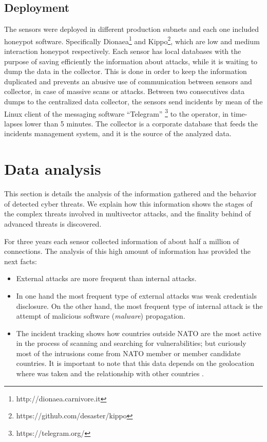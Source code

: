 \documentclass[a4paper]{llncs}
\begin{document}
\subsection{Deployment}
The sensors were deployed in different production subnets and each one included honeypot software. Specifically Dionaea\footnote{http://dionaea.carnivore.it} and Kippo\footnote{https://github.com/desaster/kippo}, which are low and medium interaction honeypot respectively. Each sensor has local databases with the purpose of saving efficiently the information about attacks, while it is waiting to dump the data in the collector. This is done in order to keep the information duplicated and prevents an abusive use of communication between sensors and collector, in case of massive scans or attacks. Between two consecutives data dumps to the centralized data collector, the sensors send incidents by mean of the Linux client of the messaging software ``Telegram'' \footnote{https://telegram.org/} to the operator, in time-lapses lower than 5 minutes. The collector is a corporate database that feeds the incidents management system, and it is the source of the analyzed data.

\section{Data analysis}
\label{sec:analysis}
This section is details the analysis of the information gathered and the behavior of detected cyber threats. We explain how this information shows the stages of the complex threats involved in multivector attacks, and the finality behind of advanced threats is discovered.

For three years each sensor collected information of about half a million of connections. The analysis of this high amount of information has provided the next facts:
\begin{itemize}
	\item External attacks are more frequent than internal attacks.
	\item In one hand the most frequent type of external attacks was weak credentials disclosure. On the other hand, the most frequent type of internal attack is the attempt of malicious software ({\it malware}) propagation.
	\item The incident tracking shows how countries outside NATO are the most active in the process of scanning and searching for vulnerabilities; but curiously most of the intrusions come from NATO member or member candidate countries. It is important to note that this data depends on the geolocation where was taken and the relationship with other countries \cite{wiki-cyberwarfare-china,wiki-cyberwarfare-eeuu}.
\end{itemize}
\end{document}
